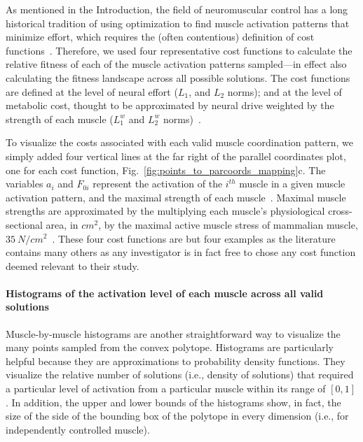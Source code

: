 \documentclass[9pt,twocolumn,twoside,lineno]{pnas-new}
\begin{document}
{As mentioned in the Introduction, the field of neuromuscular control has a long historical tradition of using optimization to find muscle activation patterns that minimize effort, which requires the (often contentious) definition of cost functions~\cite{spoor1983balancing,Chao1978Graphical,Prilutsky2000Muscle,crowninshield1981physiologically}. Therefore, we used four representative cost functions to calculate the relative fitness of each of the muscle activation patterns sampled---in effect also calculating the fitness landscape across all possible solutions. The cost functions are defined at the level of neural effort ($L_1$, and $L_2$ norms); and at the level of metabolic cost, thought to be approximated by neural drive weighted by the strength of each muscle ($L_1^w$ and $L_2^w$ norms)~\cite{Prilutsky2000Muscle,crowninshield1981physiologically}.

To visualize the costs associated with each valid muscle coordination pattern, we simply added four vertical lines at the far right of the parallel coordinates plot, one for each cost function, Fig.~\ref{fig:points_to_parcoords_mapping}c. The variables $a_i$ and $F_{0i}$ represent the activation of the $i^{th}$ muscle in a given muscle activation pattern, and the maximal strength of each muscle~\cite{Prilutsky2000Muscle,crowninshield1981physiologically}. Maximal muscle strengths are approximated by the multiplying each muscle's physiological cross-sectional area, in $cm^2$, by the maximal active muscle stress of mammalian muscle, $35~N/{cm^2}$~\cite{Zajac1993Muscle}. These four cost functions are but four examples as the literature contains many others as any investigator is in fact free to chose any cost function deemed relevant to their study.


\paragraph*{Histograms of the activation level of each muscle across all valid solutions}

Muscle-by-muscle histograms are another straightforward way to visualize the many points sampled from the convex polytope. Histograms are particularly helpful because they are approximations to probability density functions.
They visualize the relative number of solutions (i.e., density of solutions) that required a particular level of activation from a particular muscle within its range of $[0,1]$.
In addition, the upper and lower bounds of the histograms show, in fact, the size of the side of the bounding box of the polytope in every dimension (i.e., for independently controlled muscle).

}
\end{document}
